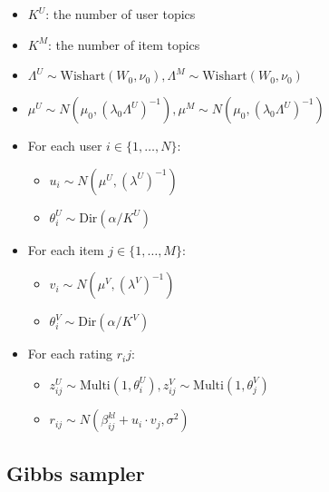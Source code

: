 \documentclass{article}
\begin{document}
 \begin{itemize}
                \item $K^U$: the number of user topics
                \item $K^M$: the number of item topics
                \item $\Lambda^U \sim \text{Wishart}(W_0, \nu_0), \Lambda^M \sim \text{Wishart}(W_0, \nu_0)$
                \item $\mu^U \sim N(\mu_0, (\lambda_0 \Lambda^U)^{-1}), \mu^M \sim N(\mu_0, (\lambda_0 \Lambda^U)^{-1})$

                \item For each user $i \in \{1, \ldots, N\}$:
                \begin{itemize}
                        \item $u_i \sim N(\mu^U, (\lambda^U)^{-1})$
                        \item $\theta_i^U \sim \text{Dir}(\alpha/K^U)$
                \end{itemize}

                \item For each item $j \in \{1, \ldots, M\}$:
                \begin{itemize}
                        \item $v_i \sim N(\mu^V, (\lambda^V)^{-1})$
                        \item $\theta_i^V \sim \text{Dir}(\alpha/K^V)$
                \end{itemize}

                \item For each rating $r_ij$:
                \begin{itemize}
                        \item $z_{ij}^U \sim \text{Multi}(1, \theta_i^U), z_{ij}^V \sim \text{Multi}(1, \theta_j^V)$
                        \item $r_{ij} \sim N(\beta_{ij}^{kl} + u_i \cdot v_j, \sigma^2)$
                \end{itemize}
        \end{itemize}


\subsection{Gibbs sampler}
\end{document}
